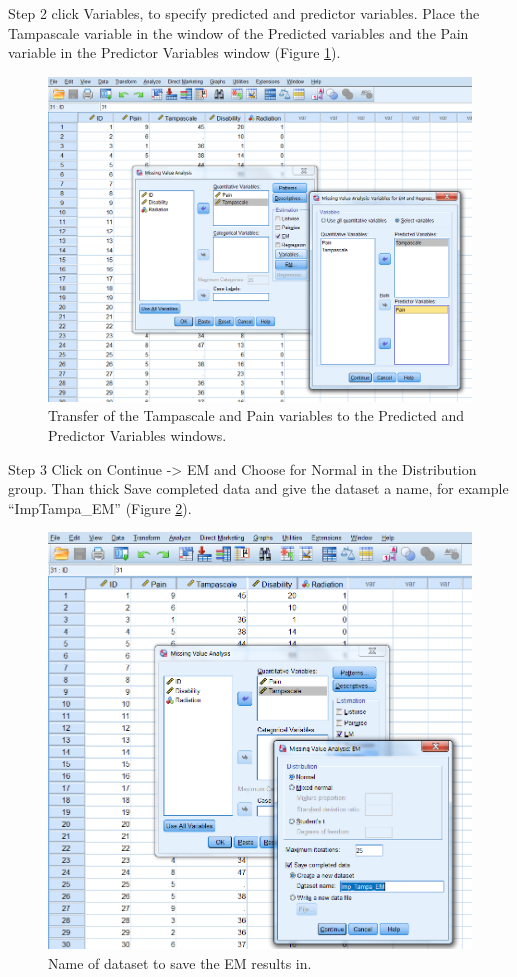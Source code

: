 \documentclass[]{book}
\begin{document}
Step 2 click Variables, to specify predicted and predictor variables.
Place the Tampascale variable in the window of the Predicted variables
and the Pain variable in the Predictor Variables window (Figure
\ref{fig:fig3-11}).

\begin{figure}

{\centering \includegraphics[width=0.7\linewidth]{images/fig3.11} 

}

\caption{Transfer of the Tampascale and Pain variables to the Predicted and Predictor Variables windows.}\label{fig:fig3-11}
\end{figure}

Step 3 Click on Continue -\textgreater{} EM and Choose for Normal in the
Distribution group. Than thick Save completed data and give the dataset
a name, for example ``ImpTampa\_EM'' (Figure \ref{fig:fig3-12}).

\begin{figure}

{\centering \includegraphics[width=0.7\linewidth]{images/fig3.12} 

}

\caption{Name of dataset to save the EM results in.}\label{fig:fig3-12}
\end{figure}
\end{document}
